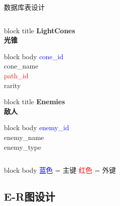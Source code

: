 \documentclass{beamer}
\begin{document}
\begin{frame}{数据库表设计}
\begin{columns}[T]
        \begin{column}{0.25\textwidth}
            \begin{beamercolorbox}[rounded=true,shadow=true]{block title}
                \centering\textbf{LightCones \\光锥}
            \end{beamercolorbox}
            \begin{beamercolorbox}[rounded=true]{block body}
                \footnotesize
                \textcolor{blue}{cone\_id} \\
                cone\_name \\
                \textcolor{red}{path\_id} \\
                rarity
            \end{beamercolorbox}
            
            \vspace{0.5cm}
            
            \begin{beamercolorbox}[rounded=true,shadow=true]{block title}
                \centering\textbf{Enemies \\敌人}
            \end{beamercolorbox}
            \begin{beamercolorbox}[rounded=true]{block body}
                \footnotesize
                \textcolor{blue}{enemy\_id} \\
                enemy\_name \\
                enemy\_type
            \end{beamercolorbox}
        \end{column}
    \end{columns}
    
    \vspace{0.3cm}
    \begin{beamercolorbox}[rounded=true,shadow=true]{block body}
        \centering\footnotesize
        \textcolor{blue}{蓝色} = 主键 \hspace{1cm} 
        \textcolor{red}{红色} = 外键
    \end{beamercolorbox}
\end{frame}


\subsection{E-R图设计}
\end{document}
